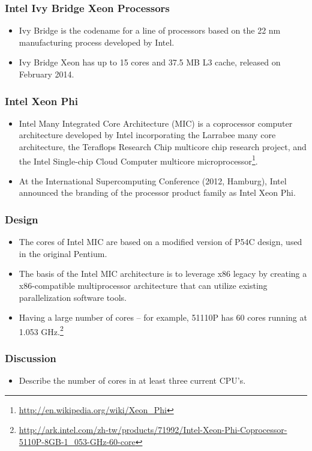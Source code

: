 \documentclass{beamer}
\begin{document}
\begin{CJK}{UTF8}{bsmi}
\begin{frame}
\frametitle{Intel Ivy Bridge Xeon Processors}
\begin{itemize}
\item Ivy Bridge is the codename for a line of processors based on the
  22 nm manufacturing process developed by Intel.%
\item Ivy Bridge Xeon has up to 15 cores and 37.5 MB L3 cache,
  released on February 2014.
\end{itemize}
\end{frame}

\begin{frame}
\frametitle{Intel Xeon Phi}
\begin{itemize}
\item Intel Many Integrated Core Architecture (MIC) is a coprocessor
  computer architecture developed by Intel incorporating the Larrabee
  many core architecture, the Teraflops Research Chip multicore chip
  research project, and the Intel Single-chip Cloud Computer multicore
  microprocessor\footnote{\url{http://en.wikipedia.org/wiki/Xeon_Phi}}.
\item At the International Supercomputing Conference (2012, Hamburg),
  Intel announced the branding of the processor product family as
  Intel Xeon Phi.
\end{itemize}
\end{frame}

\begin{frame}
\frametitle{Design}
\begin{itemize}
\item The cores of Intel MIC are based on a modified version of P54C
  design, used in the original Pentium.
\item The basis of the Intel MIC architecture is to leverage x86
  legacy by creating a x86-compatible multiprocessor architecture that
  can utilize existing parallelization software tools.
\item Having a large number of cores -- for example, 51110P has 60
  cores running at 1.053 GHz.\footnote{\url{http://ark.intel.com/zh-tw/products/71992/Intel-Xeon-Phi-Coprocessor-5110P-8GB-1_053-GHz-60-core}}
\end{itemize}
\end{frame}

\begin{frame}
\frametitle{Discussion} 
\begin{itemize}
\item Describe the number of cores in at least three current CPU's.
\end{itemize}
\end{frame}



\end{CJK}
\end{document}

